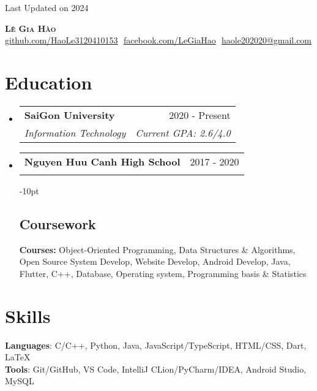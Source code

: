 \documentclass[letterpaper,11pt]{article}
\makeatletter
\newcommand{\resumeSubheading}[4]{
  \vspace{-2pt}\item
    \begin{tabular*}{0.97\textwidth}[t]{l@{\extracolsep{\fill}}r}
      \textbf{#1} & #2 \\
      \textit{\small#3} & \textit{\small #4} \\
    \end{tabular*}\vspace{-7pt}
}
\newcommand{\resumeSubHeadingListStart}{\begin{itemize}[leftmargin=0.15in, label={}]}
\newcommand{\resumeSubHeadingListEnd}{\end{itemize}}
\makeatother
\begin{document}
\begin{flushright}
  \color{gray}
  \item
  Last Updated on 2024
\end{flushright}

\vspace{-5pt}

\begin{center}
    \textbf{\Huge \scshape Lê Gia Hào} \\ \vspace{8pt}
    \small 
    \href{https://github.com/HaoLe3120410153}{\underline{github.com/HaoLe3120410153}} $  $
    \href{https://www.facebook.com/giahao.le.71271}{\underline{facebook.com/LeGiaHao}} $  $
    \href{mailto:haole202020@gmail.com}
    {\underline{haole202020@gmail.com}}
\end{center}

\section{Education}
  \resumeSubHeadingListStart
  
    \resumeSubheading
      {SaiGon University}{2020 - Present}
      {Information Technology}{Current GPA: 2.6/4.0}
      
    \resumeSubheading
      {Nguyen Huu Canh High School}{2017 - 2020}
      {}

    \vspace{-10pt}

    \subsection{Coursework}
      \textbf{Courses:} Object-Oriented Programming, Data Structures \& Algorithms, Open Source System Develop, Website Develop, Android Develop, Java, Flutter, C++, Database, Operating system, Programming basis \& Statistics 

  \resumeSubHeadingListEnd

\section{Skills}
 \begin{itemize}[leftmargin=0.15in, label={}]
    \small{\item{
    
     \textbf{Languages}{: C/C++, Python, Java, JavaScript/TypeScript, HTML/CSS, Dart, \LaTeX} \\
     
     \textbf{Tools}{: Git/GitHub, VS Code, IntelliJ CLion/PyCharm/IDEA, Android Studio, MySQL}
     
     
    }}
 \end{itemize}
\end{document}
